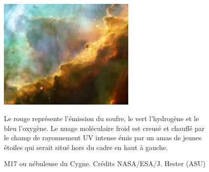 \documentclass[11pt,a4paper,twoside,openright]{article}
\begin{document}
\begin{spacing}{0.98}
\begin{figure}[!p]
    \centering
    \includegraphics[trim = {0 0 0 0},clip, width=0.6\textwidth]{figure/omega.pdf}
    \vspace{1em}
    \caption{M17 ou nébuleuse du Cygne.
    Crédits NASA/ESA/J. Hester (ASU)}
    \vspace{1em}
    \begin{minipage}{\textwidth}
    Le rouge représente l'émission du soufre, le vert l'hydrogène et le bleu l'oxygène. Le nuage moléculaire froid est creusé et chauffé par le champ de rayonnement UV intense émis par un amas de jeunes étoiles qui serait situé hors du cadre en haut à gauche.
    \end{minipage} 
    \label{fig:m17}
\end{figure}{}



\end{spacing}
\end{document}
